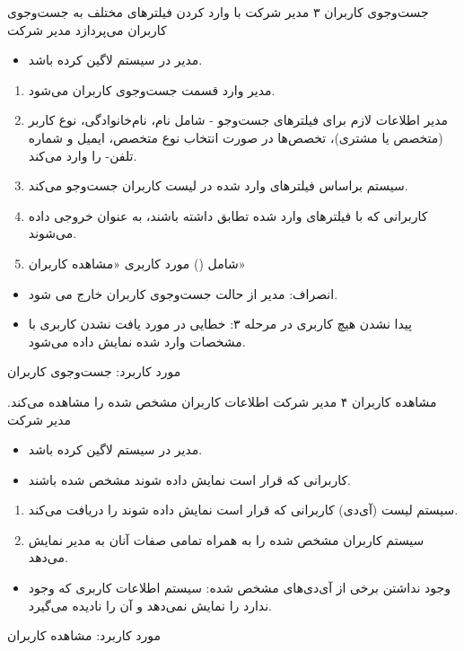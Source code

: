 \usecase
{جست‌وجوی کاربران}
{۳}
{مدیر شرکت با وارد کردن فیلترهای مختلف به جست‌و‌جوی کاربران می‌پردازد}
{مدیر شرکت}
{}
{
	\begin{itemize}
	\item
	مدیر در سیستم لاگین کرده باشد.
	
	\end{itemize}
 }
{
\begin{enumerate}
	\item 
	مدیر وارد قسمت جست‌وجوی کاربران می‌شود.
	
	\item 
	مدیر اطلاعات لازم برای فیلتر‌های جست‌وجو - شامل نام،‌ نام‌خانوادگی، نوع کاربر (متخصص یا مشتری)، تخصص‌ها در صورت انتخاب نوع متخصص، ایمیل و شماره تلفن- را وارد می‌کند.
	
	\item
	سیستم براساس فیلتر‌های وارد شده در لیست کاربران جست‌وجو می‌کند.
	
	\item 
	کاربرانی که با فیلتر‌های وارد شده تطابق داشته باشند، به عنوان خروجی داده می‌شوند.
	
	\item
	شامل () مورد کاربری «مشاهده کاربران»
\end{enumerate}
}
{}
{
\begin{itemize}
	\item	
	انصراف: مدیر از حالت جست‌وجوی کاربران خارج می شود.
	
	\item 
	پیدا نشدن هیچ کاربری در مرحله ۳: خطایی در مورد یافت نشدن کاربری با مشخصات وارد شده نمایش داده می‌شود.
\end{itemize}
}
{مورد کاربرد: جست‌وجوی کاربران}



\usecase
{مشاهده کاربران}
{۴}
{مدیر شرکت اطلاعات کاربران مشخص شده را مشاهده می‌کند.}
{مدیر شرکت}
{}
{
		\begin{itemize}
		\item
		مدیر در سیستم لاگین کرده باشد.
		
		\item
		‌کاربرانی که قرار است نمایش داده شوند مشخص شده باشند.
	\end{itemize}
}
{
\begin{enumerate}
	\item 
	سیستم لیست (آی‌دی) کاربرانی که قرار است نمایش داده شوند را دریافت می‌کند.
	
	\item
	سیستم کاربران مشخص شده را به همراه تمامی صفات آنان به مدیر نمایش می‌دهد.
\end{enumerate}
}
{
}
{
	\begin{itemize}
		\item 
		وجود نداشتن برخی از آی‌دی‌های مشخص شده: سیستم اطلاعات کاربری که وجود ندارد را نمایش نمی‌دهد و آن را نادیده می‌گیرد.
	\end{itemize}
}
{مورد کاربرد: مشاهده کاربران}


